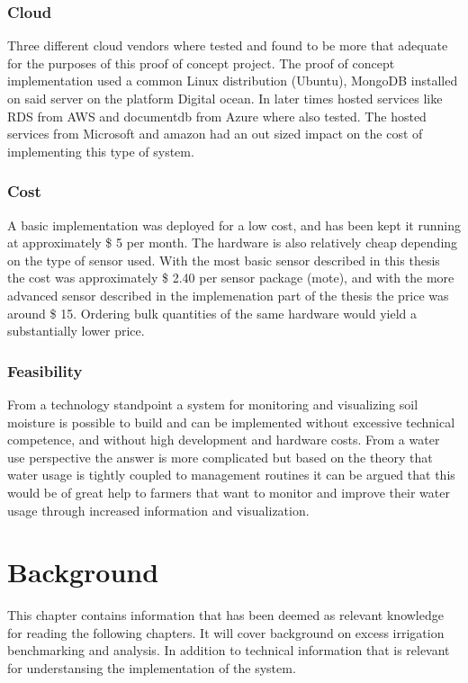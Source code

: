 \documentclass[]{uiophd}
\begin{document}
\subsection{Cloud}
Three different cloud vendors where tested and found to be more that adequate for the purposes of this proof of concept project. The proof of concept implementation used a common Linux distribution (Ubuntu), MongoDB installed on said server on the platform Digital ocean. In later times hosted services like RDS from AWS and documentdb from Azure where also tested. The hosted services from Microsoft and amazon had an out sized impact on the cost of implementing this type of system.

\subsection{Cost}
A basic implementation was deployed for a low cost, and has been kept it running at approximately \$ 5 per month. The hardware is also relatively cheap depending on the type of sensor used. With the most basic sensor described in this thesis the cost was approximately \$ 2.40 per sensor package (mote), and with the more advanced sensor described in the implemenation part of the thesis the price was around \$ 15. Ordering bulk quantities of the same hardware would yield a substantially lower price.

\subsection{Feasibility}
From a technology standpoint a system for monitoring and visualizing soil moisture is possible to build and can be implemented without excessive technical competence, and without high development and hardware costs. From a water use perspective the answer is more complicated but based on the theory that water usage is tightly coupled to management routines it can be argued that this would be of great help to farmers that want to monitor and improve their water usage through increased information and visualization.


\chapter{Background}

This chapter contains information that has been deemed as relevant knowledge for reading the  following chapters. It will cover background on excess irrigation benchmarking and analysis. In addition to technical information that is relevant for understansing the implementation of the system.
\end{document}
